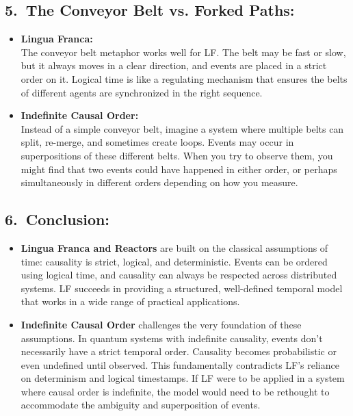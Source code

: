 \documentclass[../../../OAE-SPEC-MAIN.tex]{subfiles}
\begin{document}
\subsection*{5.\ The Conveyor Belt vs. Forked Paths:}

\begin{itemize}[leftmargin=1.5em]
\item \textbf{Lingua Franca:}\\
  The conveyor belt metaphor works well for LF. The belt may be fast or slow, but it always moves in a clear direction, and events are placed in a strict order on it. Logical time is like a regulating mechanism that ensures the belts of different agents are synchronized in the right sequence.

\item \textbf{Indefinite Causal Order:}\\
  Instead of a simple conveyor belt, imagine a system where multiple belts can split, re-merge, and sometimes create loops. Events may occur in superpositions of these different belts. When you try to observe them, you might find that two events could have happened in either order, or perhaps simultaneously in different orders depending on how you measure.
\end{itemize}

\subsection*{6.\ Conclusion:}

\begin{itemize}[leftmargin=1.5em]
\item \textbf{Lingua Franca and Reactors} are built on the classical assumptions of time: causality is strict, logical, and deterministic. Events can be ordered using logical time, and causality can always be respected across distributed systems. LF succeeds in providing a structured, well-defined temporal model that works in a wide range of practical applications.
\item \textbf{Indefinite Causal Order} challenges the very foundation of these assumptions. In quantum systems with indefinite causality, events don’t necessarily have a strict temporal order. Causality becomes probabilistic or even undefined until observed. This fundamentally contradicts LF's reliance on determinism and logical timestamps. If LF were to be applied in a system where causal order is indefinite, the model would need to be rethought to accommodate the ambiguity and superposition of events.
\end{itemize}
\end{document}
